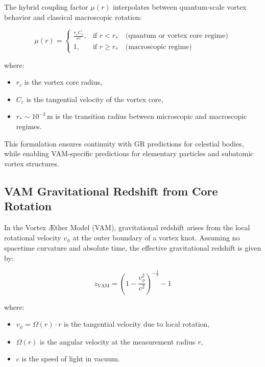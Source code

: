 The hybrid coupling factor \( \mu(r) \) interpolates between quantum-scale vortex behavior and classical macroscopic rotation:

\begin{equation}
    \mu(r) =
    \begin{cases}
        \displaystyle \frac{r_c C_e}{r^2}, & \text{if } r < r_\ast \quad \text{(quantum or vortex core regime)} \\
        1, & \text{if } r \geq r_\ast \quad \text{(macroscopic regime)}
    \end{cases}
\end{equation}

where:
\begin{itemize}
    \item \( r_c \) is the vortex core radius,
    \item \( C_e \) is the tangential velocity of the vortex core,
    \item \( r_\ast \sim 10^{-3} \, \text{m} \) is the transition radius between microscopic and macroscopic regimes.
\end{itemize}

This formulation ensures continuity with GR predictions for celestial bodies, while enabling VAM-specific predictions for elementary particles and subatomic vortex structures.
\subsection*{VAM Gravitational Redshift from Core Rotation}

In the Vortex Æther Model (VAM), gravitational redshift arises from the local rotational velocity \( v_\phi \) at the outer boundary of a vortex knot. Assuming no spacetime curvature and absolute time, the effective gravitational redshift is given by:

\begin{equation}
    z_{\text{VAM}} =
    \left( 1 - \frac{v_\phi^2}{c^2} \right)^{-\frac{1}{2}} - 1
\end{equation}

where:
\begin{itemize}
    \item \( v_\phi = \Omega(r) \cdot r \) is the tangential velocity due to local rotation,
    \item \( \Omega(r) \) is the angular velocity at the measurement radius \( r \),
    \item \( c \) is the speed of light in vacuum.
\end{itemize}

